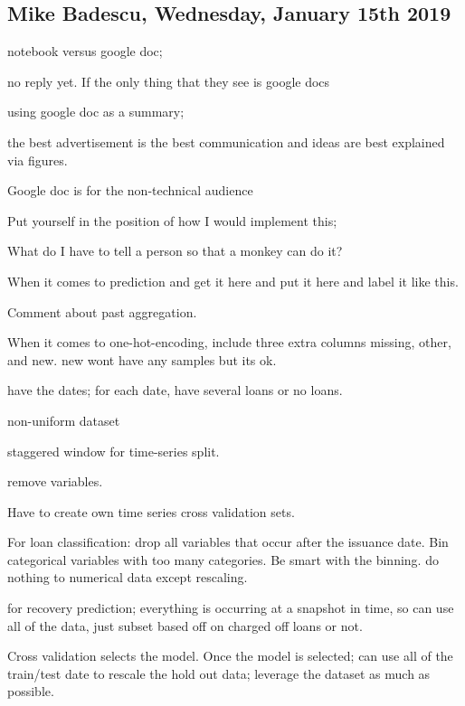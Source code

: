 \subsection{Mike Badescu, Wednesday, January 15th 2019}

notebook versus google doc;

no reply yet. If the only thing that they see is
google docs

using google doc as a summary;

the best advertisement is the best communication
and ideas are best explained via figures.

Google doc is for the non-technical audience


Put yourself in the position of how I would implement this;

What do I have to tell a person so that a monkey can do it?

When it comes to prediction and get it here and put it here and
label it like this.

Comment about past aggregation.

When it comes to one-hot-encoding, include three extra columns
missing, other, and new. new wont have any samples but its ok.


have the dates; for each date, have several loans or no loans.

non-uniform dataset

staggered window for time-series split.

remove variables. 

Have to create own time series cross validation sets.

For loan classification: drop all variables that occur after the issuance date.
Bin categorical variables with too many categories. Be smart with the binning.
do nothing to numerical data except rescaling.

for recovery prediction; everything is occurring at a snapshot in time, so can
use all of the data, just subset based off on charged off loans or not. 

Cross validation selects the model. Once the model is selected; can use all of
the train/test date to rescale the hold out data; leverage the dataset as much as possible. 